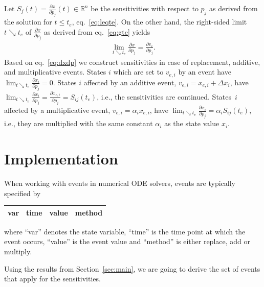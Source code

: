 \documentclass[journal, a4paper]{IEEEtran}
\begin{document}
Let
$S_j(t) = \frac{\partial x}{\partial p_j}(t) \in \mathbb R^n$
be the sensitivities with respect to $p_j$ as derived from the solution for $t \leq t_e$, eq.~\eqref{eq:leqte}. On the other hand, the right-sided limit $t\searrow t_e$ of $\frac{\partial x}{\partial p_j}$ as derived from eq.~\eqref{eq:gte} yields
\begin{align}
    \lim_{t\searrow t_e}\frac{\partial x}{\partial p_j} = \frac{\partial v_e}{\partial p_j}.
    \label{eq:dxdp}
\end{align}
Based on eq.~\eqref{eq:dxdp} we construct sensitivities in case of replacement, additive, and multiplicative events. States $i$ which are set to $v_{e, i}$ by an event have $\lim_{t\searrow t_e}\frac{\partial x_i}{\partial p_j} = 0$. States $i$ affected by an additive event, $v_{e, i} = x_{e, i} + \Delta x_i$, have $\lim_{t\searrow t_e}\frac{\partial x_i}{\partial p_j} = \frac{\partial x_{e, i}}{\partial p_j} = S_{ij}(t_e)$, i.e., the sensitivities are continued. States~$i$ affected by a multiplicative event, $v_{e, i} = \alpha_i x_{e, i}$, have $\lim_{t\searrow t_e}\frac{\partial x_i}{\partial p_j} = \alpha_i S_{ij}(t_e)$, i.e., they are multiplied with the same constant $\alpha_i$ as the state value $x_i$.


\section{Implementation}


When working with events in numerical ODE solvers, events are typically specified by
\begin{center}
\begin{tabular}{|c|c|c|c|}\hline
     var & time & value & method \\
     \hline
\end{tabular}
\end{center}
where ``var'' denotes the state variable, ``time'' is the time point at which the event occurs, ``value'' is the event value and ``method'' is either replace, add or multiply.

Using the results from Section~\ref{sec:main}, we are going to derive the set of events that apply for the sensitivities.
\end{document}
